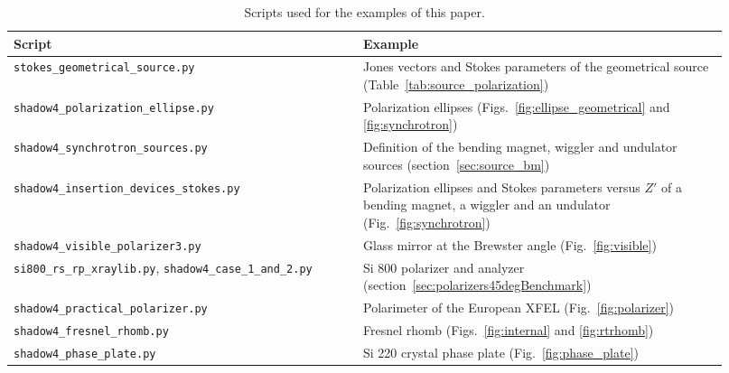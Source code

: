 \documentclass{iucr}
\begin{document}
\begin{table}
\caption{Scripts used for the examples of this paper.}
\label{tab:scripts}
\begin{tabular}{p{0.45\linewidth}p{0.47\linewidth}}
\hline
Script & Example \\
\hline
{\tt stokes\_geometrical\_source.py} & Jones vectors and Stokes parameters of the geometrical source (Table~\ref{tab:source_polarization}) \\
{\tt shadow4\_polarization\_ellipse.py} & Polarization ellipses (Figs.~\ref{fig:ellipse_geometrical} and \ref{fig:synchrotron}) \\
{\tt shadow4\_synchrotron\_sources.py} & Definition of the bending magnet, wiggler and undulator sources (section~\ref{sec:source_bm}) \\
{\tt shadow4\_insertion\_devices\_stokes.py} & Polarization ellipses and Stokes parameters versus $Z'$ of a bending magnet, a wiggler and an undulator (Fig.~\ref{fig:synchrotron}) \\
{\tt shadow4\_visible\_polarizer3.py} & Glass mirror at the Brewster angle (Fig.~\ref{fig:visible}) \\
{\tt si800\_rs\_rp\_xraylib.py}, {\tt shadow4\_case\_1\_and\_2.py} & Si 800 polarizer and analyzer (section~\ref{sec:polarizers45degBenchmark}) \\
{\tt shadow4\_practical\_polarizer.py} & Polarimeter of the European XFEL (Fig.~\ref{fig:polarizer}) \\
{\tt shadow4\_fresnel\_rhomb.py} & Fresnel rhomb (Figs.~\ref{fig:internal} and \ref{fig:rtrhomb}) \\
{\tt shadow4\_phase\_plate.py} & Si 220 crystal phase plate (Fig.~\ref{fig:phase_plate}) \\
\hline
\end{tabular}
\end{table}


\end{document}
